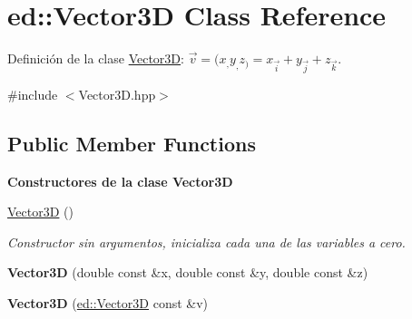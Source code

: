 \hypertarget{classed_1_1Vector3D}{}\section{ed\+:\+:Vector3D Class Reference}
\label{classed_1_1Vector3D}


Definición de la clase \mbox{\hyperlink{classed_1_1Vector3D}{Vector3D}}\+: $ \vec{v} = (x_, y_, z_) = x_ \vec{i} + y_ \vec{j} + z_ \vec{k} $.  




{\ttfamily \#include $<$Vector3\+D.\+hpp$>$}

\subsection*{Public Member Functions}
\begin{Indent}\textbf{ Constructores de la clase Vector3D}\par
\begin{DoxyCompactItemize}
\item 
\mbox{\hyperlink{classed_1_1Vector3D_a6747bbbfd5d1fac542e46315aed209e5}{Vector3D}} ()
\begin{DoxyCompactList}\small\item\em Constructor sin argumentos, inicializa cada una de las variables a cero. \end{DoxyCompactList}\item 
\mbox{\label{classed_1_1Vector3D_ab338fbfc5e42af056568727cdfccb0f2}} 
{\bfseries Vector3D} (double const \&x, double const \&y, double const \&z)
\item 
\mbox{\label{classed_1_1Vector3D_a777ab163dc0be27858fdfd4d4706ff40}} 
{\bfseries Vector3D} (\mbox{\hyperlink{classed_1_1Vector3D}{ed\+::\+Vector3D}} const \&v)
\end{DoxyCompactItemize}
\end{Indent}
